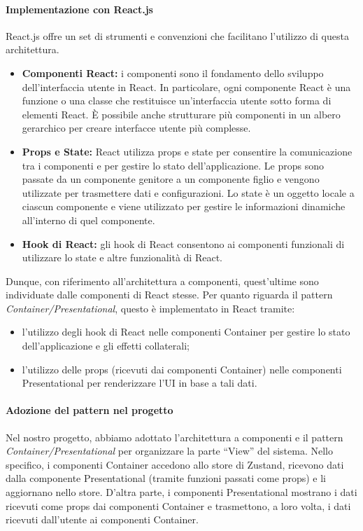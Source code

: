 \paragraph{Implementazione con React.js}
React.js offre un set di strumenti e convenzioni che facilitano l'utilizzo di questa architettura.
\begin{itemize}
    \item \textbf{Componenti React:} i componenti sono il fondamento dello sviluppo dell'interfaccia utente in React. In particolare, ogni componente React è una funzione o una classe che restituisce un'interfaccia utente sotto forma di elementi React. È possibile anche strutturare più componenti in un albero gerarchico per creare interfacce utente più complesse.
    \item \textbf{Props e State:} React utilizza props e state per consentire la comunicazione tra i componenti e per gestire lo stato dell'applicazione. Le props sono passate da un componente genitore a un componente figlio e vengono utilizzate per trasmettere dati e configurazioni. Lo state è un oggetto locale a ciascun componente e viene utilizzato per gestire le informazioni dinamiche all'interno di quel componente.
    \item \textbf{Hook di React:} gli hook di React consentono ai componenti funzionali di utilizzare lo state e altre funzionalità di React. 
\end{itemize}
Dunque, con riferimento all'architettura a componenti, quest'ultime sono individuate dalle componenti di React stesse.
Per quanto riguarda il pattern \textit{Container/Presentational}, questo è implementato in React tramite:
\begin{itemize}
    \item l'utilizzo degli hook di React nelle componenti Container per gestire lo stato dell'applicazione e gli effetti collaterali;
    \item l'utilizzo delle props (ricevuti dai componenti Container) nelle componenti Presentational per renderizzare l'UI in base a tali dati.
\end{itemize}

\paragraph{Adozione del pattern nel progetto}
Nel nostro progetto, abbiamo adottato l'architettura a componenti e il pattern \textit{Container/Presentational} per organizzare la parte ``View'' del sistema. Nello specifico, i componenti Container accedono allo store di Zustand, ricevono dati dalla componente Presentational (tramite funzioni passati come props) e li aggiornano nello store. D'altra parte, i componenti Presentational mostrano i dati ricevuti come props dai componenti Container e trasmettono, a loro volta, i dati ricevuti dall'utente ai componenti Container.

